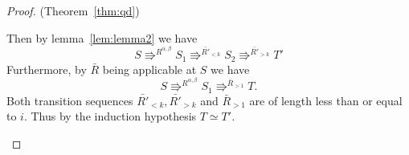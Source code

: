 \begin{proof}{(Theorem~\ref{thm:qd})}
\begin{description}
      Then by lemma~\ref{lem:lemma2} we have
      \begin{equation*}
        S \Rrightarrow^{{R}^{\alpha, \beta}} S_1 \Rrightarrow^{\bar{R'}_{<k}}
        S_2 \Rrightarrow^{\bar{R'}_{>k}} T'
      \end{equation*}
      Furthermore, by $\bar{R}$ being applicable at $S$ we have
      \begin{equation*}
        S \Rrightarrow^{R^{\alpha, \beta}} S_1 \Rrightarrow^{\bar{R}_{>1}}
        T.
      \end{equation*}
      Both transition sequences $\bar{R'}_{<k}, \bar{R'}_{>k}$ and
      $\bar{R}_{>1}$ are of length less than or equal to $i$.  Thus by the
      induction hypothesis $T \simeq T'$.
  \end{description}
\end{proof}






